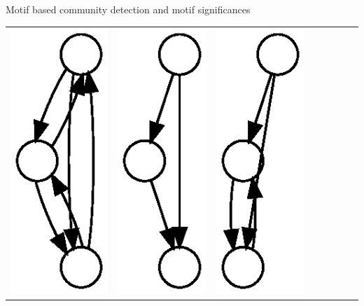 \documentclass[unknownkeysallowed]{beamer}
\begin{document}
\begin{frame}{Motif based community detection and motif significances}
\begin{tabular}{l|lllllll}
    \includegraphics[height=0.10\textheight]{M4-plain} &
    \includegraphics[height=0.10\textheight]{M5-plain} &
    \includegraphics[height=0.10\textheight]{M6-plain} &

\end{tabular}
\end{frame}
\end{document}
